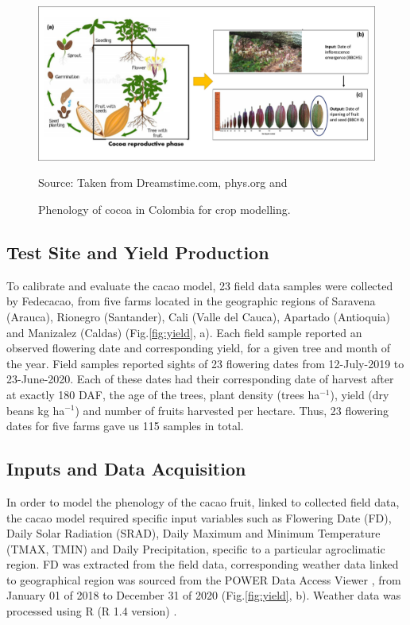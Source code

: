 \documentclass[gene,journal,article,submit,moreauthors,pdftex]{Definitions/mdpi}
\begin{document}
\begin{figure}[h!]
	\centering
	\includegraphics[scale=0.15]{images/phenology.png}\\
	\caption{\footnotesize {Phenology of cocoa in Colombia for crop modelling.\\}} 
	\footnotesize{Source: Taken from Dreamstime.com, phys.org \citep{toledo2021} and \cite{lopez2018}}
	\label{fig:pheno}
\end{figure}

\subsection{Test Site and Yield Production }

To calibrate and evaluate the cacao model, 23 field data samples were collected by Fedecacao, from five farms located in the geographic regions of Saravena (Arauca), Rionegro (Santander), Cali (Valle del Cauca), Apartado (Antioquia) and Manizalez (Caldas) (Fig.\ref{fig:yield}, a). Each field sample reported an observed flowering date and corresponding yield, for a given tree and month of the year. Field samples reported sights of 23 flowering dates from 12-July-2019 to 23-June-2020. Each of these dates had their corresponding date of harvest after at exactly 180 DAF,  the age of the trees, plant density (trees ha$^{-1}$), yield  (dry beans kg ha$^{-1}$) and number of fruits harvested per hectare. Thus, 23 flowering dates for five farms gave us 115 samples in total.


\subsection{Inputs and Data Acquisition }

In order to model the phenology of the cacao fruit, linked to collected field data, the cacao model required specific input variables such as Flowering Date (FD), Daily Solar Radiation (SRAD), Daily Maximum and Minimum Temperature (TMAX, TMIN) and Daily Precipitation, specific to a particular agroclimatic region. FD was extracted from the field data, corresponding weather data linked to geographical region was sourced from the POWER Data Access Viewer \citep{nasapower}, from January 01 of 2018 to December 31 of 2020 (Fig.\ref{fig:yield}, b). Weather data was processed using R (R 1.4 version) \citep{Rstudio2020}. 
\end{document}
